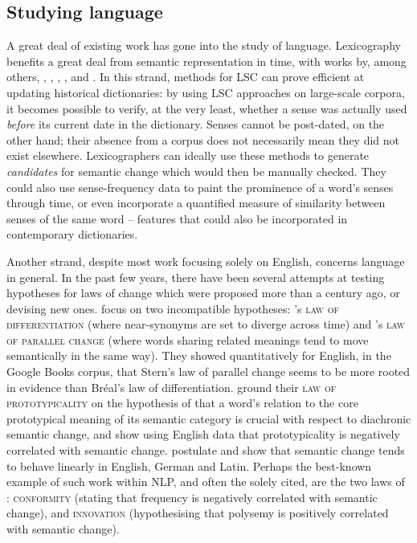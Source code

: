 \documentclass[output=paper]{langscibook}
\begin{document}
\subsection{Studying language}

A great deal of  existing work has gone into the study of language. 
Lexicography benefits a great deal from semantic representation in time, with works by, among others, \citet{lau-etal-2012-word},  \citet{falk2014}, \citet{fiser-ljubesic-2018}, \citet{klosaluengen}, and \citet{torresrivera2020detecting}.
In this strand, methods for LSC can prove efficient at updating historical dictionaries: by using LSC approaches on large-scale corpora, it becomes possible to verify, at the very least, whether a sense was actually used \emph{before} its current date in the dictionary. 
Senses cannot be post-dated, on the other hand; their absence from a corpus does not necessarily mean they did not exist elsewhere. 
Lexicographers can ideally use these methods to generate \emph{candidates} for semantic change which would then be manually checked. They could also use sense-frequency data to paint the prominence of a word's senses through time, or even incorporate a quantified measure of similarity between senses of the same word -- features that could also be incorporated in contemporary dictionaries.

Another strand, despite most work focusing solely on English, concerns language in general. 
In the past few years, there have been several attempts at testing hypotheses for laws of change which were proposed more than a century ago, or devising new ones.
\citet{xu15} focus on two incompatible hypotheses: \citet{breal1897essai}'s \textsc{law of differentiation} (where near-synonyms are set to diverge across time) and \citet{stern1921swift}'s \textsc{law of parallel change} (where words sharing related meanings tend to move semantically in the same way). They showed quantitatively for English, in the Google Books corpus, that Stern's law of parallel change seems to be more rooted in evidence than Bréal's law of differentiation. 
\citet{dubossarsky2015bottom} ground their \textsc{law of prototypicality} on the hypothesis of \citet{geeraerts1997diachronic} that a word's relation to the core prototypical meaning of its semantic category is crucial with respect to diachronic semantic change, and show using English data that prototypicality is negatively correlated with semantic change.
\citet{eger-mehler-2016-linearity} postulate and show that semantic change tends to behave linearly in English, German and Latin.
Perhaps the best-known example of such work within NLP, and often the solely cited, are the two laws  of \citet{hamilton-etal-2016-diachronic}: \textsc{conformity} (stating that frequency is negatively correlated with semantic change), and \textsc{innovation} (hypothesising that polysemy is positively correlated with semantic change).
\end{document}
